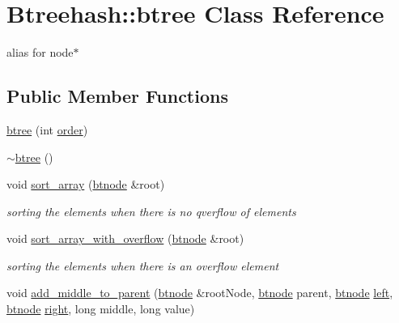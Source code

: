 \hypertarget{class_btreehash_1_1btree}{\section{Btreehash\-:\-:btree Class Reference}
\label{class_btreehash_1_1btree}
}


alias for node$\ast$  


\subsection*{Public Member Functions}
\begin{DoxyCompactItemize}
\item 
\hyperlink{class_btreehash_1_1btree_afc510f6863ad88d463d6fd46616e7345}{btree} (int \hyperlink{class_btreehash_1_1btree_a7ca6fafd2339665f465b893c2d42af96}{order})
\item 
\hyperlink{class_btreehash_1_1btree_ae3125a37cac1f9f7217b6a6ae998d4ad}{$\sim$btree} ()
\item 
void \hyperlink{class_btreehash_1_1btree_aebc95aee0efe70394f18cafcbfccf4cf}{sort\-\_\-array} (\hyperlink{namespace_btreehash_ac7db8bb3c794c446de540bf6a03955bc}{btnode} \&root)
\begin{DoxyCompactList}\small\item\em sorting the elements when there is no qverflow of elements \end{DoxyCompactList}\item 
void \hyperlink{class_btreehash_1_1btree_aa2a4792d3d7bcd0bb9623fb78fa60ea4}{sort\-\_\-array\-\_\-with\-\_\-overflow} (\hyperlink{namespace_btreehash_ac7db8bb3c794c446de540bf6a03955bc}{btnode} \&root)
\begin{DoxyCompactList}\small\item\em sorting the elements when there is an overflow element \end{DoxyCompactList}\item 
void \hyperlink{class_btreehash_1_1btree_a626d4c9fe5b5ce8da2f5b1b6642bbf21}{add\-\_\-middle\-\_\-to\-\_\-parent} (\hyperlink{namespace_btreehash_ac7db8bb3c794c446de540bf6a03955bc}{btnode} \&root\-Node, \hyperlink{namespace_btreehash_ac7db8bb3c794c446de540bf6a03955bc}{btnode} parent, \hyperlink{namespace_btreehash_ac7db8bb3c794c446de540bf6a03955bc}{btnode} \hyperlink{class_btreehash_1_1btree_a28446f49e1bc8ce73a574f012ab635b8}{left}, \hyperlink{namespace_btreehash_ac7db8bb3c794c446de540bf6a03955bc}{btnode} \hyperlink{class_btreehash_1_1btree_a9080e564fcae45de5f86131e7bbda303}{right}, long middle, long value)

\end{DoxyCompactItemize}
